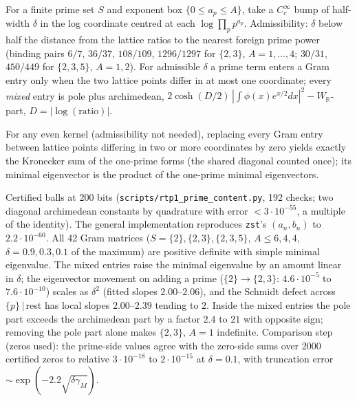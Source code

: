 For a finite prime set $S$ and exponent box $\{0\le a_p\le A\}$, take a $C_c^\infty$ bump of half-width
$\delta$ in the log coordinate centred at each $\log\prod_pp^{a_p}$. Admissibility: $\delta$ below half the
distance from the lattice ratios to the nearest foreign prime power (binding pairs $6/7$, $36/37$, $108/109$,
$1296/1297$ for $\{2,3\}$, $A = 1,\dots,4$; $30/31$, $450/449$ for $\{2,3,5\}$, $A = 1,2$). For admissible $\delta$ a
prime term enters a Gram entry only when the two lattice points differ in at most one coordinate; every
\emph{mixed} entry is pole plus archimedean, $2\cosh(D/2)\,|\!\int\phi(x)e^{x/2}dx|^2-W_{\mathbb R}$-part, $D = |\log(\text{ratio})|$.

\begin{lemma}
\label{lem:mixed-entries-kronecker}
For any even kernel (admissibility not needed), replacing every Gram entry between lattice points differing in
two or more coordinates by zero yields exactly the Kronecker sum of the one-prime forms (the shared diagonal
counted once); its minimal eigenvector is the product of the one-prime minimal eigenvectors.
\end{lemma}

\begin{numerical}
\label{num:rtp-prime-content}
Certified balls at 200 bits (\texttt{scripts/rtp1\_prime\_content.py}, 192 checks; two diagonal archimedean
constants by quadrature with error $<3\cdot10^{-55}$, a multiple of the identity). The general implementation
reproduces \texttt{zst}'s $(a_n,b_n)$ to $2.2\cdot10^{-60}$. All 42 Gram matrices ($S = \{2\},\{2,3\},\{2,3,5\}$,
$A\le6,4,4$, $\delta = 0.9,0.3,0.1$ of the maximum) are positive definite with simple minimal eigenvalue. The
mixed entries raise the minimal eigenvalue by an amount linear in $\delta$; the eigenvector movement on adding
a prime ($\{2\}\to\{2,3\}$: $4.6\cdot10^{-5}$ to $7.6\cdot10^{-10}$) scales as $\delta^2$ (fitted slopes
$2.00$--$2.06$), and the Schmidt defect across $\{p\}\,|\,$rest has local slopes $2.00$--$2.39$ tending to $2$.
Inside the mixed entries the pole part exceeds the archimedean part by a factor $2.4$ to $21$ with opposite
sign; removing the pole part alone makes $\{2,3\}$, $A = 1$ indefinite. Comparison step (zeros used): the
prime-side values agree with the zero-side sums over 2000 certified zeros to relative $3\cdot10^{-18}$ to
$2\cdot10^{-15}$ at $\delta = 0.1$, with truncation error $\sim\exp(-2.2\sqrt{\delta\gamma_M})$.
\end{numerical}

